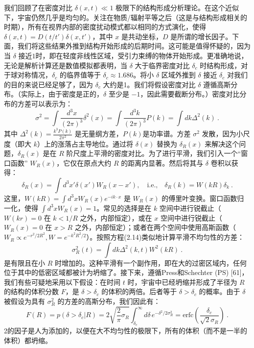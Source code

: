 我们回顾了在密度对比 \( \delta(x, t) \ll 1 \) 极限下的结构形成分析理论。在这个近似下，宇宙仍然几乎是均匀的。关注在物质/辐射平等之后（这是与结构形成相关的时期），所有在视界内部的密度扰动模式都以相同的方式演化，使得 \( \delta(x, t) = D(t/t')\delta(x, t') \)，其中 \( x \) 是共动坐标，\( D \) 是所谓的增长因子。下面，我们将这些结果外推到结构开始形成的后期时间。这可能是值得怀疑的，因为当 \( \delta \) 接近$1$时，即在轻度非线性区域，受引力束缚的物体开始形成。更准确地说，无论是解析计算还是数值模拟都表明，当 \( \delta \) 大于临界密度对比 \( \delta_c \) 时结构形成，对于球对称情况，\( \delta_c \) 的临界值等于 \( \delta_c \approx 1.686 \)。将小 \( \delta \) 区域外推到 \( \delta \) 接近 \( \delta_c \) 对我们的目的来说已经足够了，因为 \( \delta_c \) 大约是1。我们将假设密度对比 \( \delta \) 遵循高斯分布。（实际上，由于密度是正的，\( \delta \) 至少是 \( -1 \)，因此需要截断分布。）密度对比分布的方差可以表示为：
\begin{equation}
\sigma^2 = \int \frac{d^3x}{(2\pi)^3} \delta^2(x) = \int \frac{d^3k}{(2\pi)^3} P(k) = \int dk \Delta^2(k)~.
\end{equation}
其中 \( \Delta^2(k) = \frac{k^3 P(k)}{2\pi^2} \) 是无量纲方差，\( P(k) \)是功率谱。方差 \( \sigma^2 \) 发散，因为小尺度（即大 \( k \)）上的涨落占主导地位。通过将 \( \delta(x) \) 替换为 \( \delta_R(x) \) 来解决这个问题，\( \delta_R(x) \) 是在 \( R \) 阶尺度上平滑的密度对比。为了进行平滑，我们引入一个“窗口函数” \( W_R(x) \)，它仅在原点大约 \( R \) 的距离内显著。然后将其与 \( \delta \) 卷积以获得：
\begin{equation}
\delta_R(x) = \int d^3x' \delta(x') W_R(x - x'), \quad \text{i.e.,} \quad \delta_R(k) = W(kR) \delta_k~. 
\end{equation}
这里，\( W(kR) = \int d^3x W_R(x) e^{-ik \cdot x} \) 是 \( W_R(x) \) 的傅里叶变换。窗口函数归一化，使得 \( \int d^3x W_R(x) = 1 \)。常见的选择是在 \( k \) 空间中进行锐截止（\( W(kr) = 0 \) 在 \( k < 1/R \) 之外，内部恒定），或在 \( x \) 空间中进行锐截止（\( W_R(x) = 0 \) 在 \( x > R \) 之外，内部恒定）；或者在两个空间中使用高斯函数（\( W_R \propto e^{-r^2/2R^2}, W = e^{-k^2R^2/2} \)）。按照方程(2.14)类似地计算平滑不均匀性的方差：
\begin{equation}
\sigma_R^2(t) = \int dk \Delta^2(k, t) W^2(kR)~.
\end{equation}
是有限且在小 \( R \) 时增加的。这种平滑有一个副作用，即在大的过密区域内，任何位于其中的低密区域都被计为坍缩了。接下来，遵循Press和Schechter (PS) [61]，我们有些可疑地采用以下假设：在时间 \( t \) 时，宇宙中已经坍缩并形成了半径为 \( R \) 的结构的体积分数 \( F \)，是 \( \delta > \delta_c \) 的体积的两倍。后者等于 \( \delta > \delta_c \) 的概率。由于 \( \delta \) 被假设为具有 \( \sigma_R^2 \) 的方差的高斯分布，我们因此有：
\begin{equation}
F(R) = p(\delta > \delta_c|R) = 2 \sqrt{\frac{2}{\pi}\sigma_R} \int_{\delta_c}^\infty d\delta \, e^{-\delta^2/2\sigma_R^2} = \text{erfc} \left(\frac{\delta_c}{\sqrt{2}\sigma_R}\right)~.
\end{equation}
2的因子是人为添加的，以便在大不均匀性的极限下，所有的体积（而不是一半的体积）都坍缩。

